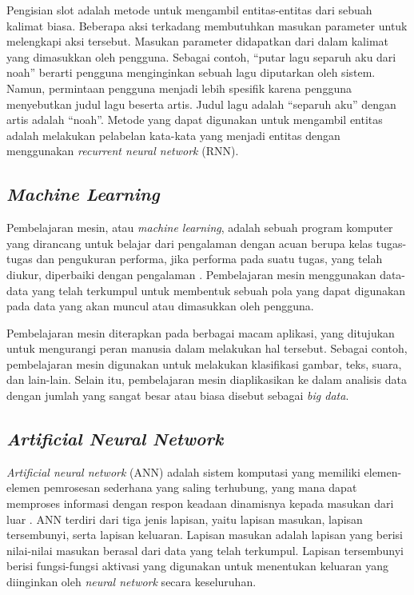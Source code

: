 Pengisian slot adalah metode untuk mengambil entitas-entitas dari sebuah kalimat biasa. Beberapa aksi terkadang membutuhkan masukan parameter untuk melengkapi aksi tersebut. Masukan parameter didapatkan dari dalam kalimat yang dimasukkan oleh pengguna. Sebagai contoh, “putar lagu separuh aku dari noah” berarti pengguna menginginkan sebuah lagu diputarkan oleh sistem. Namun, permintaan pengguna menjadi lebih spesifik karena pengguna menyebutkan judul lagu beserta artis. Judul lagu adalah “separuh aku” dengan artis adalah “noah”. Metode yang dapat digunakan untuk mengambil entitas adalah melakukan pelabelan kata-kata yang menjadi entitas dengan menggunakan \textit{recurrent neural network} (RNN).

\subsection{\textit{Machine Learning}}

Pembelajaran mesin, atau \textit{machine learning}, adalah sebuah program komputer yang dirancang untuk belajar dari pengalaman dengan acuan berupa kelas tugas-tugas dan pengukuran performa, jika performa pada suatu tugas, yang telah diukur, diperbaiki dengan pengalaman \parencite{mitchell1997machine}. Pembelajaran mesin menggunakan data-data yang telah terkumpul untuk membentuk sebuah pola yang dapat digunakan pada data yang akan muncul atau dimasukkan oleh pengguna.

Pembelajaran mesin diterapkan pada berbagai macam aplikasi, yang ditujukan untuk mengurangi peran manusia dalam melakukan hal tersebut. Sebagai contoh, pembelajaran mesin digunakan untuk melakukan klasifikasi gambar, teks, suara, dan lain-lain. Selain itu, pembelajaran mesin diaplikasikan ke dalam analisis data dengan jumlah yang sangat besar atau biasa disebut sebagai \textit{big data}.

\subsection{\textit{Artificial Neural Network}}

\textit{Artificial neural network} (ANN) adalah sistem komputasi yang memiliki elemen-elemen pemrosesan sederhana yang saling terhubung, yang mana dapat memproses informasi dengan respon keadaan dinamisnya kepada masukan dari luar \parencite{caudill1987neural}. ANN terdiri dari tiga jenis lapisan, yaitu lapisan masukan, lapisan tersembunyi, serta lapisan keluaran. Lapisan masukan adalah lapisan yang berisi nilai-nilai masukan berasal dari data yang telah terkumpul. Lapisan tersembunyi berisi fungsi-fungsi aktivasi yang digunakan untuk menentukan keluaran yang diinginkan oleh \textit{neural network} secara keseluruhan.

